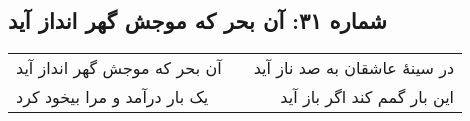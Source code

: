 \begin{center}
\section*{شماره ۳۱: آن بحر که موجش گهر انداز آید}
\label{sec:031}
\begin{longtable}{l p{0.5cm} r}
آن بحر که موجش گهر انداز آید
&&
در سینهٔ عاشقان به صد ناز آید
\\
یک بار درآمد و مرا بیخود کرد
&&
این بار گمم کند اگر باز آید
\\
\end{longtable}
\end{center}
